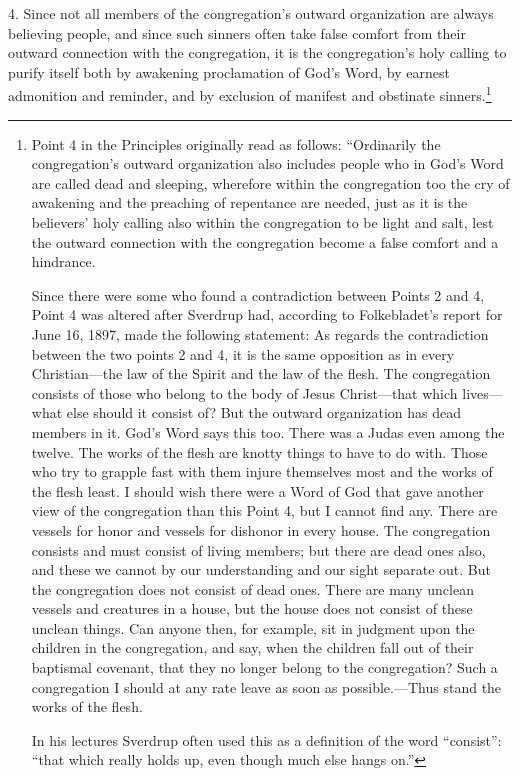 4. Since not all members of the congregation’s outward organization are always believing people, and since such sinners often take false comfort from their outward connection with the congregation, it is the congregation’s holy calling to purify itself both by awakening proclamation of God’s Word, by earnest admonition and reminder, and by exclusion of manifest and obstinate sinners.\footnote{Point 4 in the Principles originally read as follows:
“Ordinarily the congregation’s outward organization also includes people who in God’s Word are called dead and sleeping, wherefore within the congregation too the cry of awakening and the preaching of repentance are needed, just as it is the believers’ holy calling also within the congregation to be light and salt, lest the outward connection with the congregation become a false comfort and a hindrance.

Since there were some who found a contradiction between Points 2 and 4, Point 4 was altered after Sverdrup had, according to Folkebladet’s report for June 16, 1897, made the following statement:
As regards the contradiction between the two points 2 and 4, it is the same opposition as in every Christian—the law of the Spirit and the law of the flesh. The congregation consists of those who belong to the body of Jesus Christ—that which lives—what else should it consist of? But the outward organization has dead members in it. God’s Word says this too. There was a Judas even among the twelve. The works of the flesh are knotty things to have to do with. Those who try to grapple fast with them injure themselves most and the works of the flesh least. I should wish there were a Word of God that gave another view of the congregation than this Point 4, but I cannot find any. There are vessels for honor and vessels for dishonor in every house. The congregation consists and must consist of living members; but there are dead ones also, and these we cannot by our understanding and our sight separate out. But the congregation does not consist of dead ones. There are many unclean vessels and creatures in a house, but the house does not consist of these unclean things. Can anyone then, for example, sit in judgment upon the children in the congregation, and say, when the children fall out of their baptismal covenant, that they no longer belong to the congregation? Such a congregation I should at any rate leave as soon as possible.—Thus stand the works of the flesh.

In his lectures Sverdrup often used this as a definition of the word “consist”: “that which really holds up, even though much else hangs on.”}


